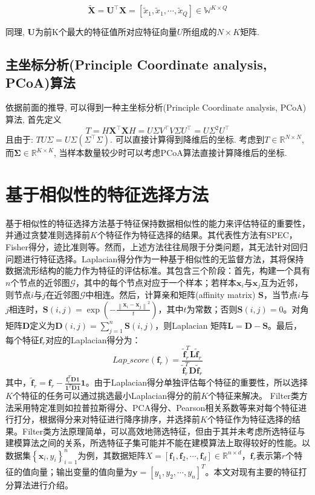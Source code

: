 \documentclass[lang=cn,10pt]{gorgeousnbook}
\numberwithin{equation}{section}%
\numberwithin{figure}{section}%
\begin{document}
\begin{equation}
\mathbf{\tilde{X}}=\mathbf{U}^{\top}\mathbf{X}=\left[ \tilde{x}_1,\tilde{x}_1,\cdots ,\tilde{x}_Q \right] \in \mathbb{W}^{K\times Q}
\end{equation}

同理, $\mathbf{U}$为前K个最大的特征值所对应特征向量$U$所组成的$N\times K$矩阵.
\subsection{主坐标分析(Principle Coordinate analysis, PCoA)算法}
依据前面的推导, 可以得到一种主坐标分析(Principle Coordinate analysis, PCoA)算法, 首先定义
\begin{equation}
T=H\mathbf{X}^{\top}\mathbf{X}H=U\varSigma V^{\top}V\varSigma U^{\top}=U\varSigma ^2U^\top 
\end{equation}
且由于: $TU\varSigma =U\varSigma \left( \varSigma ^{\top}\varSigma \right) $. 可以直接计算得到降维后的坐标. 考虑到$T\in \mathbb{R}^{N\times N}$, 而$\mathbf{\Sigma}\in \mathbb{R}^{K\times K}$, 当样本数量较少时可以考虑PCoA算法直接计算降维后的坐标. 
\section{基于相似性的特征选择方法}
基于相似性的特征选择方法基于特征保持数据相似性的能力来评估特征的重要性，并通过贪婪准则选择前$K$个特征作为特征选择的结果。其代表性方法有SPEC，Fisher得分，迹比准则等。然而，上述方法往往局限于分类问题，其无法针对回归问题进行特征选择。Laplacian得分作为一种基于相似性的无监督方法，其将保持数据流形结构的能力作为特征的评估标准。其包含三个阶段：首先，构建一个具有$n$个节点的近邻图$\mathcal{G}$，其中的每个节点对应于一个样本；若样本$\bm{x}_i$与$\bm{x}_j$互为近邻，则节点$i$与$j$在近邻图$\mathcal{G}$中相连。然后，计算亲和矩阵(affinity matrix) $\bm{S}$，当节点$i$与$j$相连时，$\bm{S}\left( i,j \right) =\exp \left( -\frac{\left\| \boldsymbol{x}_i-\boldsymbol{x}_j \right\| ^2}{t} \right) $，其中$t$为常数；否则$\bm{S}\left( i,j \right)  = 0$。对角矩阵$\bm{D}$定义为$\bm{D}\left( i,j \right) =\sum\nolimits_{j=1}^n{\bm{S}\left( i,j \right)}$，则Laplacian 矩阵$\bm{L} = \bm{D}-\bm{S}$。最后，每个特征$\bm{f}_r$对应的Laplacian得分为：
\begin{equation}
Lap\_score(\bm{f}_r)=\frac{\tilde{\bm{f}}_{r}^{T}\bm{L}\tilde{\bm{f}}_r}{\tilde{\bm{f}}_{r}^{T}\bm{D}\tilde{\bm{f}}_r}
\end{equation}
其中，$\tilde{\bm{f}}_r=\bm{f}_r-\frac{\bm{f}_{r}^{T}\bm{D}\bm{1}}{\bm{1}^T\bm{D}\bm{1}}\bm{1}$。由于Laplacian得分单独评估每个特征的重要性，所以选择$K$个特征的任务可以通过挑选最小Laplacian得分的前$K$个特征来解决。
Filter类方法采用特定准则如拉普拉斯得分、PCA得分、Pearson相关系数等来对每个特征进行打分，根据得分来对特征进行降序排序，并选择前$K$个特征作为特征选择的结果。Filter类方法原理简单，可以高效地筛选特征，但由于其并未考虑所选特征与建模算法之间的关系，所选特征子集可能并不能在建模算法上取得较好的性能。以数据集$\left\{ \boldsymbol{x}_i,y_i \right\} _{i=1}^{n}$为例，其数据矩阵$X=\left[ \bm{f}_1,\bm{f}_2,\cdots ,\bm{f}_d \right] \in \mathbb{R} ^{n\times d}$，$\bm{f}_r$表示第$r$个特征的值向量；输出变量的值向量为$\bm{y}=\left[ y_1,y_2,\cdots ,y_n \right]^T $。本文对现有主要的特征打分算法进行介绍。
\end{document}
